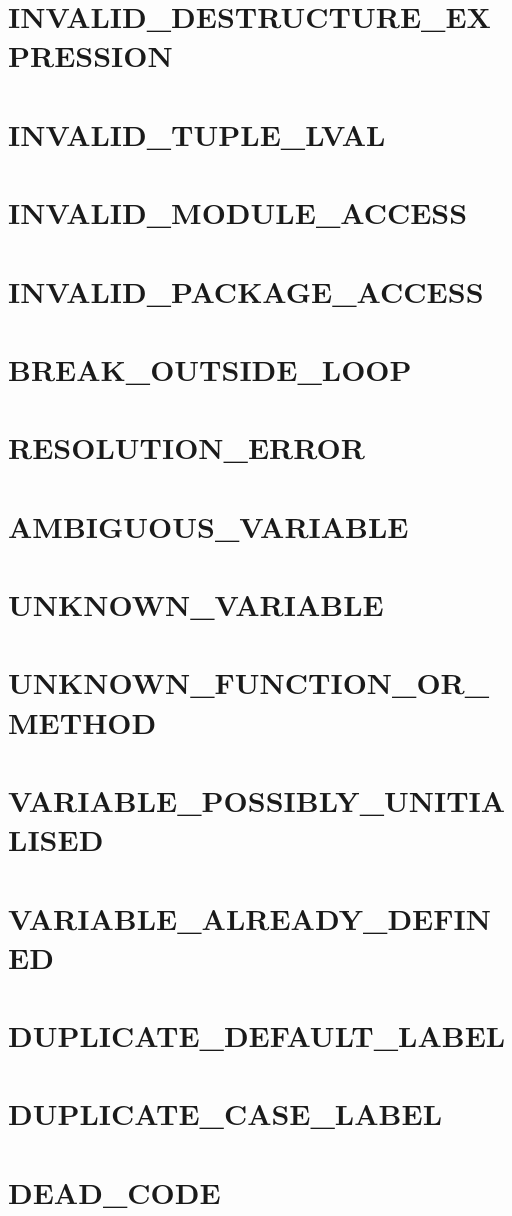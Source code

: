 \section{INVALID_DESTRUCTURE_EXPRESSION}
\section{INVALID_TUPLE_LVAL}
\section{INVALID_MODULE_ACCESS}
\section{INVALID_PACKAGE_ACCESS}
\section{BREAK_OUTSIDE_LOOP}
\section{RESOLUTION_ERROR}
\section{AMBIGUOUS_VARIABLE}
\section{UNKNOWN_VARIABLE}
\section{UNKNOWN_FUNCTION_OR_METHOD}
\section{VARIABLE_POSSIBLY_UNITIALISED}
\section{VARIABLE_ALREADY_DEFINED}
\section{DUPLICATE_DEFAULT_LABEL}
\section{DUPLICATE_CASE_LABEL}
\section{DEAD_CODE}
